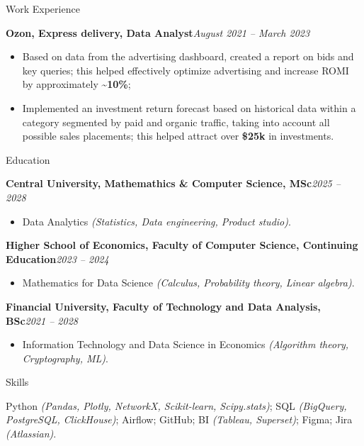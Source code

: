\documentclass[]{mcdowellcv}
\renewenvironment{cvsubsection}[2]{%
  \begin{adjustwidth}{\subsectionmargin}{\subsectionmargin}%
    {\bfseries #1}\hfill #2\par\vspace{0.5em}%
}{%
  \end{adjustwidth}%
  \vspace*{\aftersubsectionspace}%
}
\begin{document}
\begin{cvsection}{\Large Work Experience}
		\begin{cvsubsection}{Ozon, Express delivery, Data Analyst}{\textit{August 2021 -- March 2023}}
			\begin{itemize}
				\item Based on data from the advertising dashboard, created a report on bids and key queries; this helped effectively optimize advertising and increase ROMI by approximately \textbf{\textasciitilde 10\%};
				\item Implemented an investment return forecast based on historical data within a category segmented by paid and organic traffic, taking into account all possible sales placements; this helped attract over \textbf{\$25k} in investments.
			\end{itemize}
		\end{cvsubsection}
	\end{cvsection}
	
	\begin{cvsection}{\Large Education}
		\begin{cvsubsection}{Central University, Mathemathics \& Computer Science, MSc}{\textit{2025 -- 2028}}
			\begin{itemize}
				\item Data Analytics \textit{(Statistics, Data engineering, Product studio)}.
			\end{itemize}
		\end{cvsubsection}
		\begin{cvsubsection}{Higher School of Economics, Faculty of Computer Science, Continuing Education}{\textit{2023 -- 2024}}
			\begin{itemize}
				\item Mathematics for Data Science \textit{(Calculus, Probability theory, Linear algebra)}.
			\end{itemize}
		\end{cvsubsection}
		\begin{cvsubsection}{Financial University, Faculty of Technology and Data Analysis, BSc}{\textit{2021 -- 2028}}
			\begin{itemize}
				\item Information Technology and Data Science in Economics \textit{(Algorithm theory, Cryptography, ML)}.
			\end{itemize}
		\end{cvsubsection}
	\end{cvsection}
	
	\begin{cvsection}{\Large Skills}
	\vspace{-1.55em}
	\begin{cvsubsection}{}{}{}  
		Python \textit{(Pandas, Plotly, NetworkX, Scikit-learn, Scipy.stats)}; SQL \textit{(BigQuery, PostgreSQL, ClickHouse)}; Airflow; GitHub; BI \textit{(Tableau, Superset)}; Figma; Jira \textit{(Atlassian)}.
	\end{cvsubsection}
	\end{cvsection}
	
\end{document}
